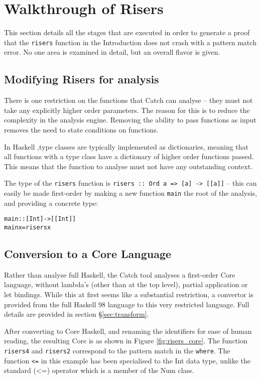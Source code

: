 \documentclass[preprint]{sigplanconf}
\newcommand{\T}[1]{\texttt{#1}}
\newenvironment{code}{\begin{alltt}\small}{\end{alltt}}
\begin{document}
\section{Walkthrough of Risers}
\label{sec:walkthrough}

This section details all the stages that are executed in order to generate a proof that the \T{risers} function in the Introduction does not crash with a pattern match error. No one area is examined in detail, but an overall flavor is given.

\subsection{Modifying Risers for analysis}

There is one restriction on the functions that Catch can analyse -- they must not take any explicitly higher order parameters. The reason for this is to reduce the complexity in the analysis engine. Removing the ability to pass functions as input removes the need to state conditions on functions.

In Haskell \citep{haskell},type classes are typically implemented \citep{type_classes} as dictionaries, meaning that all functions with a type class have a dictionary of higher order functions passed. This means that the function to analyse must not have any outstanding context.

The type of the \T{risers} function is \T{risers :: Ord a => [a] -> [[a]]} -- this can easily be made first-order by making a new function \T{main} the root of the analysis, and providing a concrete type:

\begin{code}
main :: [Int] -> [[Int]]
main x = risers x
\end{code}

\subsection{Conversion to a Core Language}

Rather than analyse full Haskell, the Catch tool analyses a first-order Core language, without lambda's (other than at the top level), partial application or let bindings. While this at first seems like a substantial restriction, a convertor is provided from the full Haskell 98 language to this very restricted language. Full details are provided in section \S\ref{sec:transform}.

After converting to Core Haskell, and renaming the identifiers for ease of human reading, the resulting Core is as shown in Figure \ref{fig:risers_core}. The function \T{risers4} and \T{risers2} correspond to the pattern match in the \T{where}. The function \T{<=} in this example has been specialised to the Int data type, unlike the standard (<=) operator which is a member of the Num class.
\end{document}
